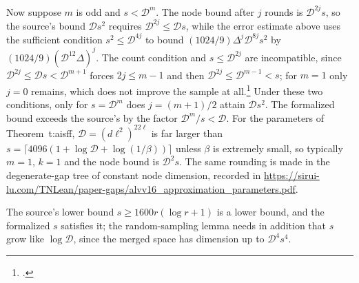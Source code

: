 \documentclass{article}
\begin{document}
Now suppose $m$ is odd and
$s<\mathcal D^m$. The node bound after $j$ rounds is $\mathcal D^{2j}s$, so
the source's bound $\mathcal Ds^2$ requires $\mathcal D^{2j}\le\mathcal Ds$,
while the error estimate above uses the sufficient condition
$s^2\le\mathcal D^{4j}$ to bound $(1024/9)\Delta^j\mathcal D^{8j}s^2$
by $(1024/9)(\mathcal D^{12}\Delta)^j$. The count condition and
$s\le\mathcal D^{2j}$ are incompatible, since
$\mathcal D^{2j}\le\mathcal Ds<\mathcal D^{m+1}$ forces $2j\le m-1$ and then
$\mathcal D^{2j}\le\mathcal D^{m-1}<s$; for $m=1$ only $j=0$ remains, which
does not improve the sample at
all.\footnote{.}
Under these two conditions, only for $s=\mathcal D^m$ does $j=(m+1)/2$ attain $\mathcal Ds^2$. The
formalized bound exceeds the source's by the factor
$\mathcal D^m/s<\mathcal D$. For the parameters of Theorem~t:aisff,
$\mathcal D=(d\ell^2)^{22\ell}$ is far larger than
$s=\lceil4096(1+\log\mathcal D+\log(1/\beta))\rceil$ unless $\beta$ is
extremely small, so typically $m=1$, $k=1$ and the node bound is
$\mathcal D^2s$. The same rounding is made in the degenerate-gap tree of
constant node dimension, recorded in
\url{https://sirui-lu.com/TNLean/paper-gaps/alvv16_approximation_parameters.pdf}.

The source's lower bound $s\ge1600r(\log r+1)$ is a lower bound, and the
formalized $s$ satisfies it; the random-sampling lemma needs in addition that
$s$ grow like $\log\mathcal D$, since the merged space has dimension up to
$\mathcal D^4s^4$.
\end{document}
